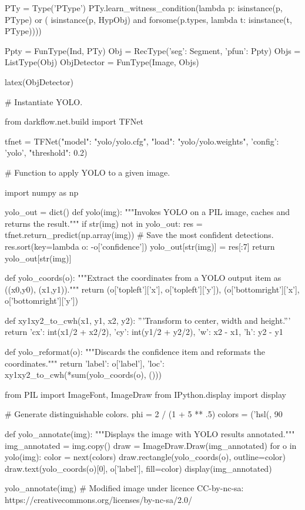 \begin{cell}
PTy = Type('PType')
PTy.learn_witness_condition(lambda p: isinstance(p, PType) or (
    isinstance(p, HypObj) and forsome(p.types, lambda t: isinstance(t, PType))))

Ppty = FunType(Ind, PTy)
Obj = RecType({'seg': Segment, 'pfun': Ppty})
Objs = ListType(Obj)
ObjDetector = FunType(Image, Objs)

latex(ObjDetector)
\end{cell}

\begin{cell}
# Instantiate YOLO.

from darkflow.net.build import TFNet

tfnet = TFNet({"model": "yolo/yolo.cfg", "load": "yolo/yolo.weights",
    'config': 'yolo', "threshold": 0.2})
\end{cell}

\begin{cell}
# Function to apply YOLO to a given image.

import numpy as np

yolo_out = dict()
def yolo(img):
    """Invokes YOLO on a PIL image, caches and returns the result."""
    if str(img) not in yolo_out:
        res = tfnet.return_predict(np.array(img))
        # Save the most confident detections.
        res.sort(key=lambda o: -o['confidence'])
        yolo_out[str(img)] = res[:7]
    return yolo_out[str(img)]

def yolo_coords(o):
    """Extract the coordinates from a YOLO output item as ((x0,y0), (x1,y1))."""
    return (o['topleft']['x'], o['topleft']['y']), (o['bottomright']['x'], o['bottomright']['y'])

def xy1xy2_to_cwh(x1, y1, x2, y2):
    '''Transform to center, width and height.'''
    return {'cx': int(x1/2 + x2/2), 'cy': int(y1/2 + y2/2), 'w': x2 - x1, 'h': y2 - y1}

def yolo_reformat(o):
    """Discards the confidence item and reformats the coordinates."""
    return {'label': o['label'],
        'loc': xy1xy2_to_cwh(*sum(yolo_coords(o), ()))}
\end{cell}

\begin{cell}
from PIL import ImageFont, ImageDraw
from IPython.display import display

# Generate distinguishable colors.
phi = 2 / (1 + 5 ** .5)
colors = ('hsl({}, 90%

def yolo_annotate(img):
    """Displays the image with YOLO results annotated."""
    img_annotated = img.copy()
    draw = ImageDraw.Draw(img_annotated)
    for o in yolo(img):
        color = next(colors)
        draw.rectangle(yolo_coords(o), outline=color)
        draw.text(yolo_coords(o)[0], o['label'], fill=color)
    display(img_annotated)
    
yolo_annotate(img)
# Modified image under licence CC-by-nc-sa: https://creativecommons.org/licenses/by-nc-sa/2.0/
\end{cell}

